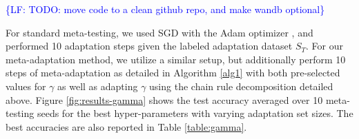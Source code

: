 \documentclass{article}
\theoremstyle{definition}
\newcommand{\LF}[1]{\textcolor{blue}{\{LF: #1\}}}
\begin{document}
\LF{TODO: move code to a clean github repo, and make wandb optional}

For standard meta-testing, we used SGD with the Adam optimizer \citep{Kingma2015}, and performed 10 adaptation steps given the labeled adaptation dataset $S_T$. For our meta-adaptation method, we utilize a similar setup, but additionally perform 10 steps of meta-adaptation as detailed in Algorithm \ref{alg1} with both pre-selected values for $\gamma$ as well as adapting $\gamma$ using the chain rule decomposition detailed above. Figure \ref{fig:results-gamma} shows the test accuracy averaged over 10 meta-testing seeds for the best hyper-parameters with varying adaptation set sizes. The best accuracies are also reported in Table \ref{table:gamma}.

\end{document}
